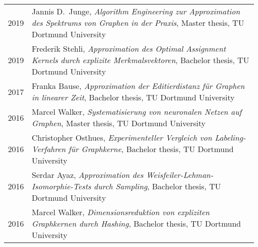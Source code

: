 \documentclass[11pt, a4paper, DIV=14, headings=small]{scrartcl}
\begin{document}
\begin{longtabu}{p{2.1cm}p{12.0cm}}
		2019 & Jannis D.\ Junge, \emph{Algorithm Engineering zur Approximation des Spektrums von Graphen in der Praxis}, Master thesis, TU Dortmund University                                                      \\
		2019 & Frederik Stehli, \emph{Approximation des Optimal Assignment Kernels durch explizite Merkmalsvektoren}, Bachelor thesis, TU Dortmund University                                                       \\
		2017 & Franka Bause, \emph{Approximation der Editierdistanz für Graphen in linearer Zeit}, Bachelor thesis, TU Dortmund University                                                                          \\
		2016 & Marcel Walker, \emph{Systematisierung von neuronalen Netzen auf Graphen}, Master thesis, TU Dortmund University                                                                                      \\
		2016 & Christopher Osthues, \emph{Experimenteller Vergleich von Labeling-Verfahren für Graphkerne}, Bachelor thesis, TU Dortmund University                                                                 \\
		2016 & Serdar Ayaz, \emph{Approximation des Weisfeiler-Lehman-Isomorphie-Tests durch Sampling}, Bachelor thesis, TU Dortmund University                                                                     \\
		2016 & Marcel Walker, \emph{Dimensionsreduktion von expliziten Graphkernen durch Hashing}, Bachelor thesis, TU Dortmund University                                                                          \\
	\end{longtabu}
	
\end{document}
